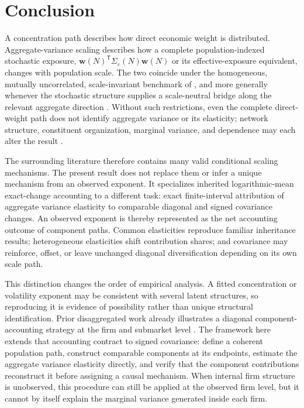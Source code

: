 {\section{Conclusion}
\label{sec:conclusion}

A concentration path describes how direct economic weight is
distributed. Aggregate-variance scaling describes how a complete
population-indexed stochastic exposure,
$\mathbf{w}(N)^{\mathsf T}\Sigma_{\varepsilon}(N)\mathbf{w}(N)$ or its
effective-exposure equivalent, changes with population scale. The two
coincide under the homogeneous, mutually uncorrelated, scale-invariant
benchmark of \citet{gabaix2011}, and more generally whenever the
stochastic structure supplies a scale-neutral bridge along the relevant
aggregate direction \citep{dupor1999}. Without such restrictions, even
the complete direct-weight path does not identify aggregate variance or
its elasticity; network structure, constituent organization, marginal
variance, and dependence may each alter the result
\citep{horvath1998,sutton2001,bottazziSecchi2006,riccaboniEtAl2008,calvinoEtAl2018}.

The surrounding literature therefore contains many valid conditional
scaling mechanisms. The present result does not replace them or infer a
unique mechanism from an observed exponent. It specializes inherited
logarithmic-mean exact-change accounting \citep{ang2005,angLiu2007} to a
different task: exact finite-interval attribution of aggregate variance
elasticity to comparable diagonal and signed covariance changes. An
observed exponent is thereby represented as the net accounting outcome
of component paths. Common elasticities reproduce familiar inheritance
results; heterogeneous elasticities shift contribution shares; and
covariance may reinforce, offset, or leave unchanged diagonal
diversification depending on its own scale path.

This distinction changes the order of empirical analysis. A fitted
concentration or volatility exponent may be consistent with several
latent structures, so reproducing it is evidence of possibility rather
than unique structural identification. Prior disaggregated work already
illustrates a diagonal component-accounting strategy at the firm and
submarket level \citep{bottazziSecchi2006}. The framework here extends
that accounting contract to signed covariance: define a coherent
population path, construct comparable components at its endpoints,
estimate the aggregate variance elasticity directly, and verify that the
component contributions reconstruct it before assigning a causal
mechanism. When internal firm structure is unobserved, this procedure can
still be applied at the observed firm level, but it cannot by itself
explain the marginal variance generated inside each firm.


}
